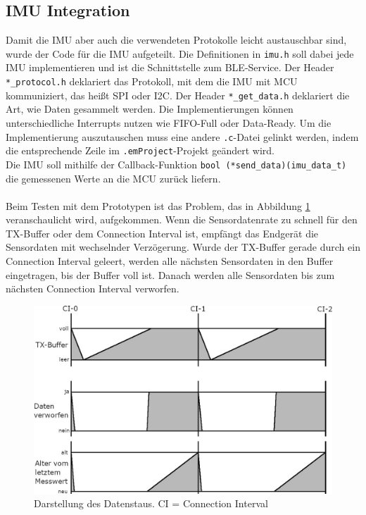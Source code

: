 \subsection{IMU Integration}
Damit die IMU aber auch die verwendeten Protokolle leicht austauschbar sind, wurde der Code für die IMU aufgeteilt.
Die Definitionen in \texttt{imu.h} soll dabei jede IMU implementieren und ist die Schnittstelle zum BLE-Service.
Der Header \texttt{*\_protocol.h} deklariert das Protokoll, mit dem die IMU mit MCU kommuniziert, das heißt SPI oder I2C.
Der Header \texttt{*\_get\_data.h} deklariert die Art, wie Daten gesammelt werden.
Die Implementierungen können unterschiedliche Interrupts nutzen wie FIFO-Full oder Data-Ready.
Um die Implementierung auszutauschen muss eine andere \texttt{.c}-Datei gelinkt werden, indem die entsprechende Zeile im \texttt{.emProject}-Projekt geändert wird.\\
Die IMU soll mithilfe der Callback-Funktion \texttt{bool (*send\_data)(imu\_data\_t)} die gemessenen Werte an die MCU zurück liefern.\\\\
Beim Testen mit dem Prototypen ist das Problem, das in Abbildung \ref{fig:daten_vorher} veranschaulicht wird, aufgekommen.
Wenn die Sensordatenrate zu schnell für den TX-Buffer oder dem Connection Interval ist, empfängt das Endgerät die Sensordaten mit wechselnder Verzögerung.
Wurde der TX-Buffer gerade durch ein Connection Interval geleert, werden alle nächsten Sensordaten in den Buffer eingetragen, bis der Buffer voll ist.
Danach werden alle Sensordaten bis zum nächsten Connection Interval verworfen.
\begin{figure}[h]
	\centering
	\includegraphics[width=0.8\linewidth]{res/datenVorher.jpg}
	\caption{Darstellung des Datenstaus. CI = Connection Interval}
	\label{fig:daten_vorher}
\end{figure}\\
